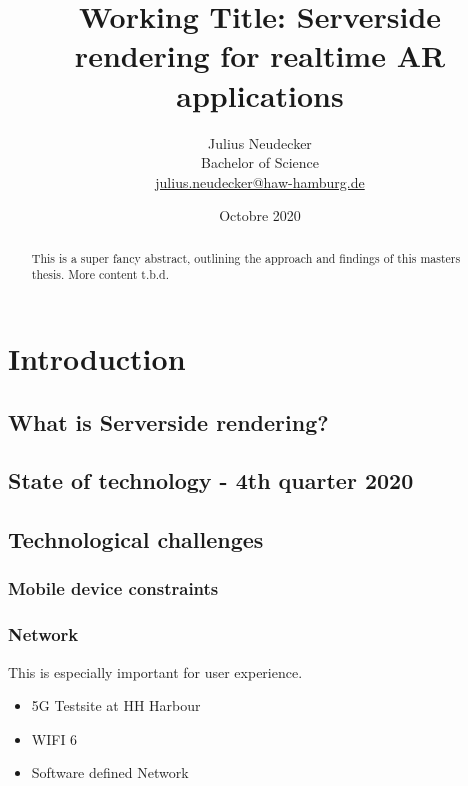 \documentclass[titlepage, a4paper, 11pt]{scrartcl}
\begin{document}
    \title{Working Title: Serverside rendering for realtime AR applications}
    \author{Julius Neudecker \\ Bachelor of Science \\ \href{mailto:julius.neudecker@haw-hamburg.de}{julius.neudecker@haw-hamburg.de} }
    \date{Octobre 2020}

    \maketitle

    \tableofcontents

    \begin{abstract}
        This is a super fancy abstract, outlining the approach and findings of this masters thesis. More content t.b.d.
    \end{abstract}

    \section{Introduction}

        \subsection{What is Serverside rendering?}

        \subsection{State of technology - 4th quarter 2020}
		
        \subsection{Technological challenges}

            \subsubsection{Mobile device constraints}

            \subsubsection{Network}

                This is especially important for user experience. 

                \begin{itemize}
                    \item 5G Testsite at HH Harbour
                    \item WIFI 6
                    \item Software defined Network
                \end{itemize}
\end{document}

